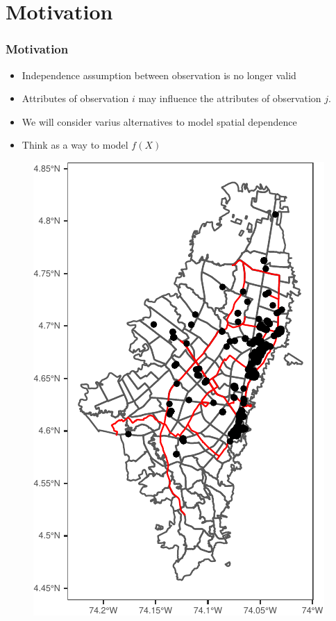 \documentclass[
  shownotes,
  xcolor={svgnames},
  hyperref={colorlinks,citecolor=DarkBlue,linkcolor=DarkRed,urlcolor=DarkBlue}
  ]{beamer}
\begin{document}
\section{Motivation }
\begin{frame}[fragile]
\frametitle{Motivation}


\begin{minipage}[t]{0.52\linewidth}
\bigskip
\begin{itemize}
  
  \item Independence assumption between observation is no longer valid
  \medskip
  \item Attributes of observation $i$  may influence the attributes of observation $j$.
  \medskip
  \item We will consider varius alternatives to model spatial dependence
  \medskip
  \item Think as a way to model $f(X)$
\end{itemize}

    \end{minipage}
    \hfill
    \begin{minipage}[t]{0.43\linewidth}%
       \medskip
        \begin{figure}[H] \centering
            \captionsetup{justification=centering}
\includegraphics[scale=0.6]{figures/restaurants_bogota.pdf}

 \end{figure}
    \end{minipage}

\end{frame}
\end{document}
